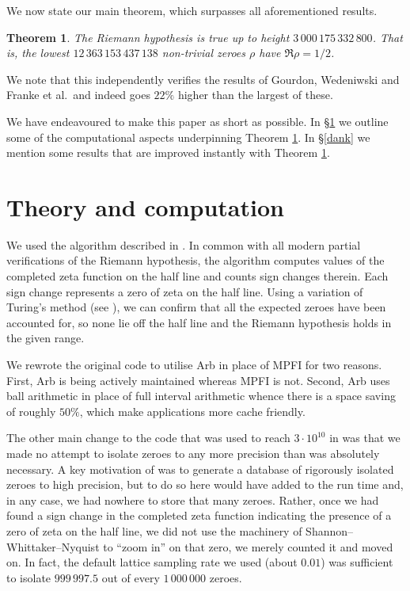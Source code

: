 \documentclass[12pt]{article}
\newtheorem{thm}{Theorem}
\begin{document}
We now state our main theorem, which surpasses all aforementioned results.
\begin{thm}\label{bank}
The Riemann hypothesis is true up to height $3\,000\,175\,332\,800$. That is, the lowest $12\,363\,153\,437\,138$ non-trivial zeroes $\rho$ have $\Re\rho = 1/2$.
\end{thm}

We note that this independently verifies the results of Gourdon, Wedeniwski and Franke et al.\ and indeed goes $22\%$ higher than the largest of these. 

We have endeavoured to make this paper as short as possible. In \S \ref{plank} we outline some of the computational aspects underpinning Theorem \ref{bank}. In \S \ref{dank} we mention some results that are improved instantly with Theorem \ref{bank}.


\section{Theory and computation}\label{plank}
%
We used the algorithm described in \cite{Platt}. In common with all modern partial verifications of the Riemann hypothesis, the algorithm computes values of the completed zeta function on the half line and counts sign changes therein. Each sign change represents a zero of zeta on the half line. Using a variation of Turing's method (see \cite{Turing1,Turing2}), we can confirm that all the expected zeroes have been accounted for, so none lie off the half line and the Riemann hypothesis holds in the given range.

We rewrote the original code to utilise Arb \cite{ARB} in place of MPFI \cite{Revol2002} for two reasons. First, Arb is being actively maintained whereas MPFI is not. Second, Arb uses ball arithmetic in place of full interval arithmetic whence there is a space saving of roughly $50\%$, which make applications more cache friendly.

The other main change to the code that was used to reach $3\cdot 10^{10}$ in \cite{Platt} was that we made no attempt to isolate zeroes to any more precision than was absolutely necessary. A key motivation of \cite{Platt} was to generate a database of rigorously isolated zeroes to high precision, but to do so here would have added to the run time and, in any case, we had nowhere to store that many zeroes. Rather, once we had found a sign change in the completed zeta function indicating the presence of a zero of zeta on the half line, we did not use the machinery of Shannon--Whittaker--Nyquist to ``zoom in'' on that zero, we merely counted it and moved on. In fact, the default lattice sampling rate we used (about $0.01$) was sufficient to isolate $999\,997.5$ out of every $1\,000\,000$ zeroes.
\end{document}

